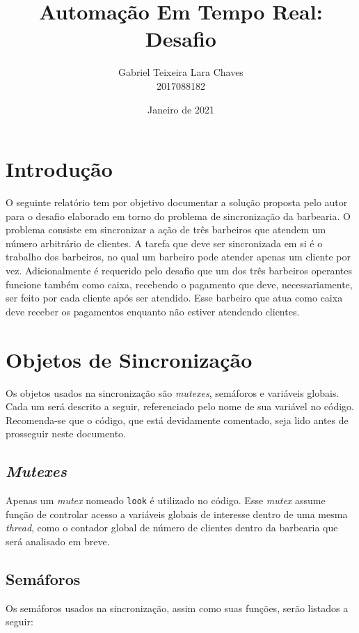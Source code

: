 \documentclass{article}
\title{Automação Em Tempo Real: Desafio}
\author{Gabriel Teixeira Lara Chaves\\
        2017088182}
\date{Janeiro de 2021}
\begin{document}
\maketitle

\section{Introdução}

O seguinte relatório tem por objetivo documentar a
solução proposta pelo autor para o desafio elaborado
em torno do problema de sincronização da barbearia.
O problema consiste em sincronizar a ação de três
barbeiros que atendem um número arbitrário de clientes.
A tarefa que deve ser sincronizada em si é o trabalho dos barbeiros, no qual um barbeiro
pode atender apenas um cliente por vez. Adicionalmente é requerido
pelo desafio que um dos três barbeiros operantes funcione também como caixa, recebendo o pagamento que
deve, necessariamente, ser feito por cada cliente após
ser atendido. Esse barbeiro que atua como caixa deve
receber os pagamentos enquanto não estiver atendendo clientes.

\section{Objetos de Sincronização}

Os objetos usados na sincronização são \textit{mutexes}, semáforos e variáveis globais.
Cada um será descrito a seguir, referenciado pelo nome de sua variável no código. Recomenda-se
que o código, que está devidamente comentado, seja lido antes de prosseguir neste documento.

\subsection{\textit{Mutexes}}

Apenas um \textit{mutex} nomeado \verb+look+ é utilizado no código. Esse \textit{mutex} assume função
de controlar acesso a variáveis globais de interesse dentro de uma mesma \textit{thread}, como o contador
global de número de clientes dentro da barbearia que será analisado em breve. 

\subsection{Semáforos}

Os semáforos usados na sincronização, assim como suas funções, serão listados a seguir:
\end{document}
